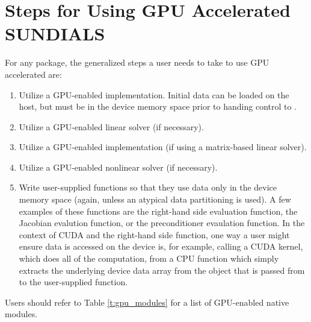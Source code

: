 \section{Steps for Using GPU Accelerated SUNDIALS}\label{s:gpu_usage}

For any {\sundials} package, the generalized steps a user needs to take
to use GPU accelerated {\sundials} are:
\begin{enumerate}
  \item Utilize a GPU-enabled {\nvector} implementation.  Initial
  data can be loaded on the host, but must be in the device memory
  space prior to handing control to {\sundials}.
  \item Utilize a GPU-enabled {\sunlinsol} linear solver (if necessary).
  \item Utilize a GPU-enabled {\sunmatrix} implementation (if using a
  matrix-based linear solver).
  \item Utilize a GPU-enabled {\sunnonlinsol} nonlinear solver (if necessary).
  \item Write user-supplied functions so that they use data only in the
  device memory space (again, unless an atypical data partitioning is used).
  A few examples of these functions are the right-hand side evaluation
  function, the Jacobian evalution function, or the preconditioner evaulation
  function.  In the context of CUDA and the right-hand side function, one way a
  user might ensure data is accessed on the device is, for example, calling a
  CUDA kernel, which does all of the computation, from a CPU function which simply
  extracts the underlying device data array from the {\nvector} object that is
  passed from {\sundials} to the user-supplied function.
\end{enumerate}
Users should refer to Table \ref{t:gpu_modules} for a list of GPU-enabled
native {\sundials} modules.